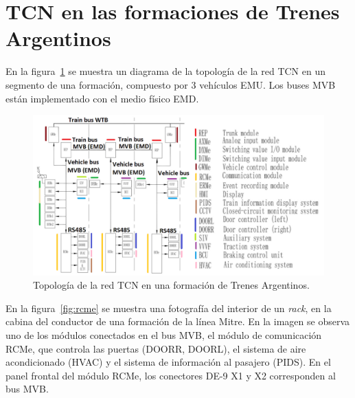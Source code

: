 \section{TCN en las formaciones de Trenes Argentinos}

En la figura~\ref{fig:tms} se muestra un diagrama de la topología de la red TCN en un segmento de una formación, compuesto por 3 vehículos EMU. Los buses MVB están implementado con el medio físico EMD.

\begin{figure}[htbp]
	\centering
	\includegraphics[width=1\textwidth]{./Figures/tms.png}
	\caption[Topología de la red TCN en una formación de Trenes Argentinos]{Topología de la red TCN en una formación de Trenes Argentinos.
        \\ }
    \label{fig:tms}
\end{figure}

En la figura~\ref{fig:rcme} se muestra una fotografía del interior de un \textit{rack}, en la cabina del conductor de una formación de la línea Mitre. En la imagen se observa uno de los módulos conectados en el bus MVB, el módulo de comunicación RCMe, que controla las puertas (DOORR, DOORL), el sistema de aire acondicionado (HVAC) y el sistema de información al pasajero (PIDS). En el panel frontal del módulo RCMe, los conectores DE-9 X1 y X2 corresponden al bus MVB.

